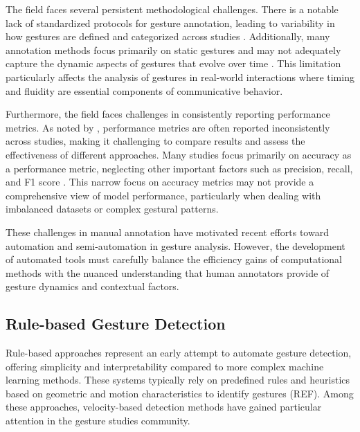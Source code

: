 The field faces several persistent methodological challenges. There is a notable lack of standardized protocols for gesture annotation, leading to variability in how gestures are defined and categorized across studies \citep{ripperdaSpeedingDetectionNoniconic2020}. Additionally, many annotation methods focus primarily on static gestures and may not adequately capture the dynamic aspects of gestures that evolve over time \citep{kimGesturalBehaviorAnalysis2012}. This limitation particularly affects the analysis of gestures in real-world interactions where timing and fluidity are essential components of communicative behavior.

Furthermore, the field faces challenges in consistently reporting performance metrics. As noted by \citet{cantaliniMoneglia2020}, performance metrics are often reported inconsistently across studies, making it challenging to compare results and assess the effectiveness of different approaches. Many studies focus primarily on accuracy as a performance metric, neglecting other important factors such as precision, recall, and F1 score \citep{namAutomaticGestureRecognition2012}. This narrow focus on accuracy metrics may not provide a comprehensive view of model performance, particularly when dealing with imbalanced datasets or complex gestural patterns.

These challenges in manual annotation have motivated recent efforts toward automation and semi-automation in gesture analysis. However, the development of automated tools must carefully balance the efficiency gains of computational methods with the nuanced understanding that human annotators provide of gesture dynamics and contextual factors.\cite{ghalebCoSpeechGestureDetection2024}


\subsection{Rule-based Gesture Detection}\label{subsec:rule}


Rule-based approaches represent an early attempt to automate gesture detection, offering simplicity and interpretability compared to more complex machine learning methods. These systems typically rely on predefined rules and heuristics based on geometric and motion characteristics to identify gestures (REF). Among these approaches, velocity-based detection methods have gained particular attention in the gesture studies community.

